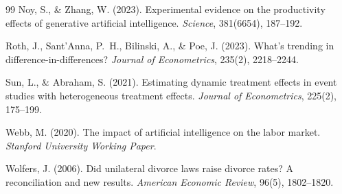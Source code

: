 \documentclass[12pt,a4paper]{article}
\begin{document}
\begin{thebibliography}{99}
Noy, S., \& Zhang, W. (2023).
Experimental evidence on the productivity effects of generative artificial intelligence.
\textit{Science}, 381(6654), 187--192.

Roth, J., Sant'Anna, P.~H., Bilinski, A., \& Poe, J. (2023).
What's trending in difference-in-differences?
\textit{Journal of Econometrics}, 235(2), 2218--2244.

Sun, L., \& Abraham, S. (2021).
Estimating dynamic treatment effects in event studies with heterogeneous treatment effects.
\textit{Journal of Econometrics}, 225(2), 175--199.

Webb, M. (2020).
The impact of artificial intelligence on the labor market.
\textit{Stanford University Working Paper}.

Wolfers, J. (2006).
Did unilateral divorce laws raise divorce rates? A reconciliation and new results.
\textit{American Economic Review}, 96(5), 1802--1820.

\end{thebibliography}
\end{document}
